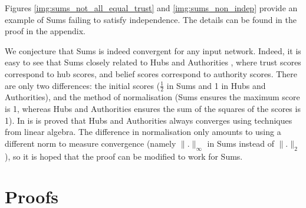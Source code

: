 \documentclass{article}
\theoremstyle{definition} \newtheorem{definition}{Definition}
\theoremstyle{definition} \newtheorem{example}{Example}
\theoremstyle{plain} \newtheorem{axiom}{Axiom}
\theoremstyle{plain} \newtheorem*{remark}{Remark}
\theoremstyle{remark} \newtheorem*{notation}{Notation}
\theoremstyle{plain} \newtheorem{lemma}{Lemma}
\theoremstyle{plain} \newtheorem{theorem}{Theorem}
\theoremstyle{plain} \newtheorem{proposition}{Proposition}
\begin{document}
Figures \ref{img:sums_not_all_equal_trust} and \ref{img:sums_non_indep}
provide an example of Sums failing to satisfy independence. The details can be
found in the proof in the appendix.

We conjecture that Sums is indeed convergent for any input network. Indeed, it
is easy to see that Sums closely related to Hubs and Authorities
\cite{kleinberg}, where trust scores correspond to hub scores, and belief
scores correspond to authority scores. There are only two differences: the
initial scores ($\frac{1}{2}$ in Sums and 1 in Hubs and Authorities), and the
method of normalisation (Sums ensures the maximum score is 1, whereas Hubs and
Authorities ensures the sum of the squares of the scores is 1). In
\cite{kleinberg} is is proved that Hubs and Authorities always converges using
techniques from linear algebra. The difference in normalisation only amounts to
using a different norm to measure convergence (namely $\|.\|_{\infty}$ in Sums
instead of $\|.\|_2$), so it is hoped that the proof can be modified to work
for Sums.

{}


\appendix
\section{Proofs}
\end{document}
